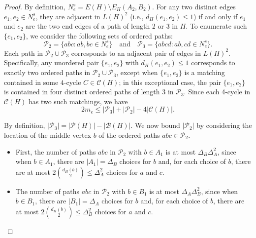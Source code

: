 \documentclass[11pt]{amsart}
\newcommand{\pp}{\mathcal{P}}
\newcommand{\cc}{\mathcal{C}}
\begin{document}
\begin{proof}By definition, $N_e^s=E(H)\setminus E_H(A_2,B_2)$. For any two distinct edges $e_1, e_2 \in N_e^s$, they are adjacent in $L(H)^2$ (i.e., $d_H(e_1, e_2) \le 1$) if and only if  $e_1$ and $e_2$ are the two end edges of a path of length 2 or 3 in $H$.  To enumerate such $\{e_1,e_2\}$, we consider the following sets of ordered paths:
$$ \mathcal{P}_2 = \{abc : ab, bc \in N_e^s\} \quad \text{and} \quad \mathcal{P}_3 = \{abcd : ab, cd \in N_e^s\}. $$
 Each path in $\pp_2\cup \pp_3$ corresponds to an adjacent pair of edges in  $L(H)^2$. Specifically, any unordered pair $\{e_1, e_2\}$ with $d_H(e_1, e_2) \leq 1$ corresponds to exactly two ordered paths in $\pp_2\cup \pp_3$, except when $\{e_1,e_2\}$ is a matching contained in some $4$-cycle $C\in \cc(H)$; in this exceptional case, the pair $\{e_1, e_2\}$ is contained in four distinct ordered paths of length 3 in $\mathcal{P}_3$.
 Since each 4-cycle in $\cc(H)$ has two such matchings, we have 
\begin{equation*}
  2m_e \le \left| \pp_3 \right| + \left| \pp_2 \right|-4|\mathcal{C}(H)|.
\end{equation*}

By definition, $\left|\pp_3\right|= |\mathcal P(H)| - |\mathcal B(H)|$. We now bound $|\pp_2|$
by considering the location of the middle  vertex $b$ of the ordered paths $abc\in \pp_2$. 
\begin{itemize}
    \item First, the number of paths $abc$ in $\pp_2$ with $b\in A_1$ is at most $\Delta_B\Delta_A^2$, since when $b\in A_1$, there are $|A_1|=\Delta_B$ choices for $b$ and, for each choice of $b$, there are at most $2\binom{d_H(b)}{2}\le \Delta_A^2$ choices for $a$ and $c$.

    \item The number of paths $abc$ in $\pp_2$ with $b\in B_1$ is at most $\Delta_A\Delta_B^2$, since when $b\in B_1$, there are $|B_1|=\Delta_A$ choices for $b$ and,  
    for each choice of $b$, there are at most $2\binom{d_H(b)}{2}\le \Delta_B^2$ choices for $a$ and $c$.


\end{itemize}
\end{proof}
\end{document}
